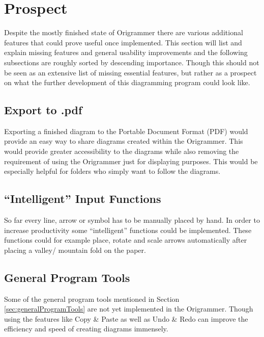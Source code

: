 
\section{Prospect}
\label{sec:prospect}

Despite the mostly finished state of Origrammer there are various additional features that could prove useful once implemented. This section will list and explain missing features and general usability improvements and the following subsections are roughly sorted by descending importance. Though this should not be seen as an extensive list of missing essential features, but rather as a prospect on what the further development of this diagramming program could look like. 

\subsection{Export to .pdf}

Exporting a finished diagram to the Portable Document Format (PDF) would provide an easy way to share diagrams created within the Origrammer. This would provide greater accessibility to the diagrams while also removing the requirement of using the Origrammer just for displaying purposes. This would be especially helpful for folders who simply want to follow the diagrams.

\subsection{``Intelligent'' Input Functions}

So far every line, arrow or symbol has to be manually placed by hand. In order to increase productivity some ``intelligent'' functions could be implemented. These functions could for example place, rotate and scale arrows automatically after placing a valley/ mountain fold on the paper.

\subsection{General Program Tools}

Some of the general program tools mentioned in Section \ref{sec:generalProgramTools} are not yet implemented in the Origrammer. Though using the features like Copy \& Paste as well as Undo \& Redo can improve the efficiency and speed of creating diagrams immensely.

